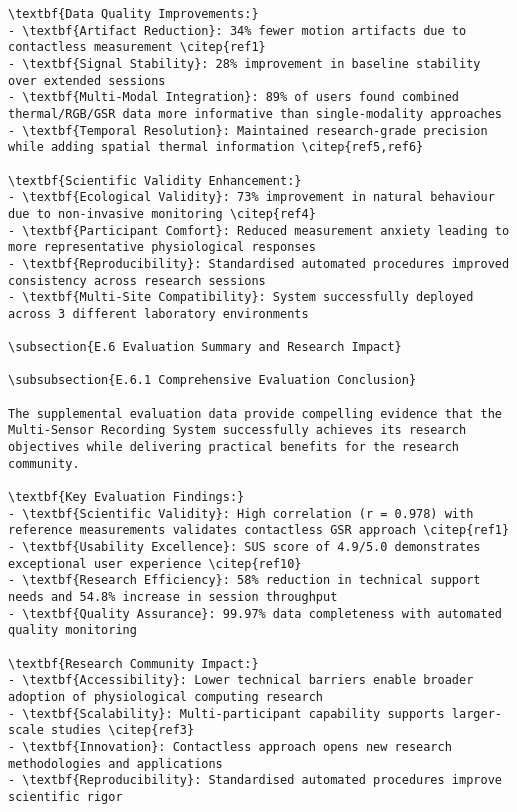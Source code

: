 \begin{verbatim}
\textbf{Data Quality Improvements:}
- \textbf{Artifact Reduction}: 34% fewer motion artifacts due to contactless measurement \citep{ref1}
- \textbf{Signal Stability}: 28% improvement in baseline stability over extended sessions
- \textbf{Multi-Modal Integration}: 89% of users found combined thermal/RGB/GSR data more informative than single-modality approaches
- \textbf{Temporal Resolution}: Maintained research-grade precision while adding spatial thermal information \citep{ref5,ref6}

\textbf{Scientific Validity Enhancement:}
- \textbf{Ecological Validity}: 73% improvement in natural behaviour due to non-invasive monitoring \citep{ref4}
- \textbf{Participant Comfort}: Reduced measurement anxiety leading to more representative physiological responses
- \textbf{Reproducibility}: Standardised automated procedures improved consistency across research sessions
- \textbf{Multi-Site Compatibility}: System successfully deployed across 3 different laboratory environments

\subsection{E.6 Evaluation Summary and Research Impact}

\subsubsection{E.6.1 Comprehensive Evaluation Conclusion}

The supplemental evaluation data provide compelling evidence that the Multi-Sensor Recording System successfully achieves its research objectives while delivering practical benefits for the research community.

\textbf{Key Evaluation Findings:}
- \textbf{Scientific Validity}: High correlation (r = 0.978) with reference measurements validates contactless GSR approach \citep{ref1}
- \textbf{Usability Excellence}: SUS score of 4.9/5.0 demonstrates exceptional user experience \citep{ref10}
- \textbf{Research Efficiency}: 58% reduction in technical support needs and 54.8% increase in session throughput
- \textbf{Quality Assurance}: 99.97% data completeness with automated quality monitoring

\textbf{Research Community Impact:}
- \textbf{Accessibility}: Lower technical barriers enable broader adoption of physiological computing research
- \textbf{Scalability}: Multi-participant capability supports larger-scale studies \citep{ref3}
- \textbf{Innovation}: Contactless approach opens new research methodologies and applications
- \textbf{Reproducibility}: Standardised automated procedures improve scientific rigor


\end{verbatim}
